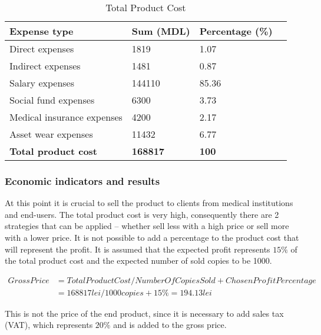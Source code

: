 \begin{table}[!ht]
\begin{center}
\caption{Total Product Cost}
\begin{tabularx}{\textwidth}{| Y | M{10em} | M{10em} |N}
\hline
\textbf{Expense type} & \textbf{Sum (MDL)} & \textbf{Percentage (\%)} &\\[18pt]
\hline
Direct expenses & 1819 & 1.07 &\\[14pt]
\hline
Indirect expenses & 1481 & 0.87 &\\[14pt]
\hline
Salary expenses & 144110 & 85.36  &\\[14pt]
\hline
Social fund expenses & 6300 & 3.73 &\\[14pt]
\hline
Medical insurance expenses & 4200 & 2.17 &\\[14pt] %
\hline
Asset wear expenses & 11432 & 6.77 &\\[14pt]
\hline
\textbf{Total product cost} & \textbf{168817} & \textbf{100} &\\[14pt] 
\hline
\end{tabularx}
\label{table:product_cost}
\end{center}
\end{table}

\subsubsection{Economic indicators and results}
At this point it is crucial to sell the product to clients from medical institutions and end-users. The total product cost is very high, consequently there are 2 strategies that can be applied -- whether sell less with a high price or sell more with a lower price. It is not possible to add a percentage to the product cost that will represent the profit. It is assumed that the expected profit represents $15\%$ of the total product cost and the expected number of sold copies to be 1000. 

\begin{equation}
 \begin{split}
  Gross Price &= Total Product Cost / Number Of Copies Sold + Chosen Profit Percentage\\
              &= 168817 lei/1000 copies + 15\% = 194.13 lei
 \end{split}
\end{equation}

This is not the price of the end product, since it is necessary to add sales tax (VAT), which represents $20\%$ and is added to the gross price. 

